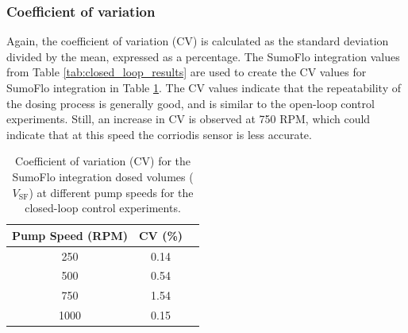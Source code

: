 \documentclass[12pt,a4paper]{article}
\begin{document}
\subsubsection{Coefficient of variation}
Again, the coefficient of variation (CV) is calculated as the standard deviation divided by the mean, expressed as a percentage. The SumoFlo integration values from Table \ref{tab:closed_loop_results} are used to create the CV values for SumoFlo integration in Table \ref{tab:cv_closed_loop}. The CV values indicate that the repeatability of the dosing process is generally good, and is similar to the open-loop control experiments. Still, an increase in CV is observed at 750 RPM, which could indicate that at this speed the corriodis sensor is less accurate.
\begin{table}[h!]
\centering
\begin{tabular}{c cc}
\toprule
\textbf{Pump Speed (RPM)} & \textbf{CV (\%)} \\
\midrule
250 & 0.14 \\
500 & 0.54 \\
750 & 1.54 \\
1000 & 0.15 \\
\bottomrule
\end{tabular}
\caption{Coefficient of variation (CV) for the SumoFlo integration dosed volumes ($V_{\text{SF}}$) at different pump speeds for the closed-loop control experiments.}
\label{tab:cv_closed_loop}
\end{table}

\end{document}
